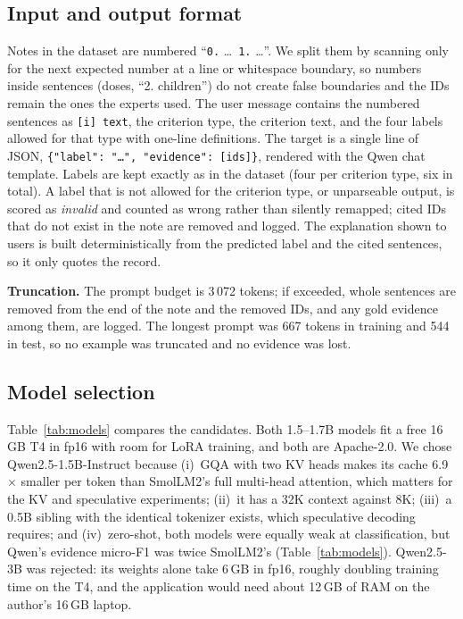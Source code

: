 \documentclass[conference]{IEEEtran}
\begin{document}
\subsection{Input and output format}
Notes in the dataset are numbered ``\texttt{0.} \dots\ \texttt{1.} \dots''. We split them by scanning only for the next expected number at a line or whitespace boundary, so numbers inside sentences (doses, ``2. children'') do not create false boundaries and the IDs remain the ones the experts used. The user message contains the numbered sentences as \texttt{[i] text}, the criterion type, the criterion text, and the four labels allowed for that type with one-line definitions. The target is a single line of JSON, \texttt{\{"label": "\dots", "evidence": [ids]\}}, rendered with the Qwen chat template. Labels are kept exactly as in the dataset (four per criterion type, six in total). A label that is not allowed for the criterion type, or unparseable output, is scored as \emph{invalid} and counted as wrong rather than silently remapped; cited IDs that do not exist in the note are removed and logged. The explanation shown to users is built deterministically from the predicted label and the cited sentences, so it only quotes the record.

\textbf{Truncation.} The prompt budget is 3\,072 tokens; if exceeded, whole sentences are removed from the end of the note and the removed IDs, and any gold evidence among them, are logged. The longest prompt was 667 tokens in training and 544 in test, so no example was truncated and no evidence was lost.

\subsection{Model selection}
Table~\ref{tab:models} compares the candidates. Both 1.5--1.7B models fit a free 16\,GB T4 in fp16 with room for LoRA training, and both are Apache-2.0. We chose Qwen2.5-1.5B-Instruct because (i)~GQA with two KV heads makes its cache 6.9$\times$ smaller per token than SmolLM2's full multi-head attention, which matters for the KV and speculative experiments; (ii)~it has a 32K context against 8K; (iii)~a 0.5B sibling with the identical tokenizer exists, which speculative decoding requires; and (iv)~zero-shot, both models were equally weak at classification, but Qwen's evidence micro-F1 was twice SmolLM2's (Table~\ref{tab:models}). Qwen2.5-3B was rejected: its weights alone take 6\,GB in fp16, roughly doubling training time on the T4, and the application would need about 12\,GB of RAM on the author's 16\,GB laptop.
\end{document}
